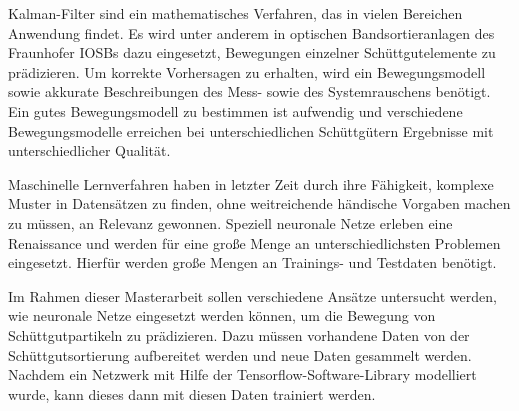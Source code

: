 \documentclass [a4paper, 10pt]{scrartcl}
\begin{document}
\Anfang
Kalman-Filter sind ein mathematisches Verfahren, das in vielen Bereichen Anwendung findet. 
Es wird unter anderem in optischen Bandsortieranlagen des Fraunhofer IOSBs dazu eingesetzt, Bewegungen einzelner Schüttgutelemente zu prädizieren.
Um korrekte Vorhersagen zu erhalten, wird ein Bewegungsmodell sowie akkurate Beschreibungen des Mess- sowie des Systemrauschens benötigt.
Ein gutes Bewegungsmodell zu bestimmen ist aufwendig und verschiedene Bewegungsmodelle erreichen bei unterschiedlichen Schüttgütern Ergebnisse mit unterschiedlicher Qualität.


Maschinelle Lernverfahren haben in letzter Zeit durch ihre Fähigkeit, 
komplexe Muster in Datensätzen zu finden, ohne weitreichende händische Vorgaben machen zu müssen, an Relevanz gewonnen.
Speziell neuronale Netze erleben eine Renaissance und werden für eine große Menge an unterschiedlichsten Problemen eingesetzt.
Hierfür werden große Mengen an Trainings- und Testdaten benötigt. 

Im Rahmen dieser Masterarbeit sollen verschiedene Ansätze untersucht werden, wie neuronale Netze eingesetzt werden können, um die Bewegung von Schüttgutpartikeln zu prädizieren.
Dazu müssen vorhandene Daten von der Schüttgutsortierung aufbereitet werden und neue Daten gesammelt werden.
Nachdem ein Netzwerk mit Hilfe der Tensorflow-Software-Library modelliert wurde, kann dieses dann mit diesen Daten trainiert werden.



\end{document}
